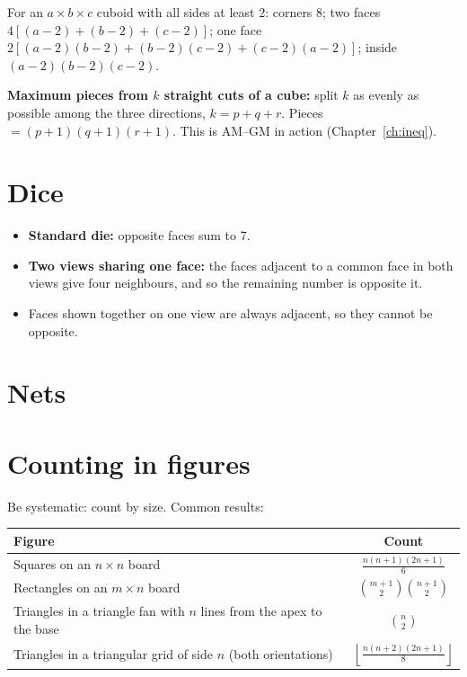 \documentclass[11pt,a4paper,openany]{report}
\newcommand{\C}[2]{\binom{#1}{#2}}
\begin{document}
For an $a\times b\times c$ cuboid with all sides at least 2: corners 8; two faces $4[(a-2)+(b-2)+(c-2)]$; one face $2[(a-2)(b-2)+(b-2)(c-2)+(c-2)(a-2)]$; inside $(a-2)(b-2)(c-2)$.

\textbf{Maximum pieces from $k$ straight cuts of a cube:} split $k$ as evenly as possible among the three directions, $k=p+q+r$. Pieces $=(p+1)(q+1)(r+1)$. This is AM--GM in action (Chapter~\ref{ch:ineq}).

\section{Dice}
\begin{itemize}[nosep]
\item \textbf{Standard die:} opposite faces sum to 7.
\item \textbf{Two views sharing one face:} the faces adjacent to a common face in both views give four neighbours, and so the remaining number is opposite it.
\item Faces shown together on one view are always adjacent, so they cannot be opposite.
\end{itemize}

\section{Nets}
\begin{center}
\end{center}

\section{Counting in figures}
Be systematic: count by size. Common results:
\begin{center}\small
\begin{tabular}{lc}
\toprule
Figure & Count\\\midrule
Squares on an $n\times n$ board & $\frac{n(n+1)(2n+1)}6$\\
Rectangles on an $m\times n$ board & $\C{m+1}2\C{n+1}2$\\
Triangles in a triangle fan with $n$ lines from the apex to the base & $\C n2$\\
Triangles in a triangular grid of side $n$ (both orientations) & $\left\lfloor\frac{n(n+2)(2n+1)}8\right\rfloor$\\
\bottomrule
\end{tabular}
\end{center}
\end{document}
